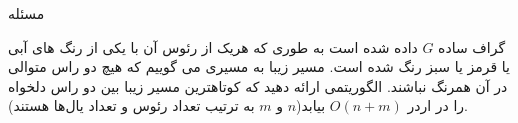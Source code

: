 ‌مسئله

گراف ساده $G$ داده شده است به طوری که هریک از رئوس آن با یکی از رنگ های آبی یا قرمز یا سبز رنگ شده است. مسیر زیبا به مسیری می گوییم که هیچ دو راس متوالی در آن همرنگ نباشند. الگوریتمی ارائه دهید که کوتاهترین مسیر زیبا بین دو راس دلخواه را در اردر 
$O(n+m)$
بیابد($n$ و $m$ به ترتیب تعداد‌ رئوس و تعداد یال‌ها هستند).










